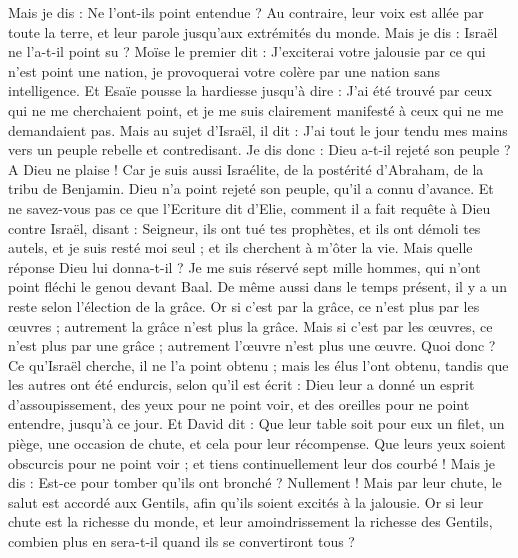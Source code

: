 \begin{multicols}{2}
Mais je dis : Ne l'ont-ils point entendue ? Au contraire, leur voix est allée par toute la terre, et leur parole jusqu’aux extrémités du monde.
Mais je dis : Israël ne l'a-t-il point su ? Moïse le premier dit : J’exciterai votre jalousie par ce qui n'est point une nation, je provoquerai votre colère par une nation sans intelligence.
Et Esaïe pousse la hardiesse jusqu’à dire : J'ai été trouvé par ceux qui ne me cherchaient point, et je me suis clairement manifesté à ceux qui ne me demandaient pas.
Mais au sujet d’Israël, il dit : J'ai tout le jour tendu mes mains vers un peuple rebelle et contredisant.
\VerseOne{}Je dis donc : Dieu a-t-il rejeté son peuple ? A Dieu ne plaise ! Car je suis aussi Israélite, de la postérité d'Abraham, de la tribu de Benjamin.
Dieu n'a point rejeté son peuple, qu’il a connu d’avance. Et ne savez-vous pas ce que l'Ecriture dit d'Elie, comment il a fait requête à Dieu contre Israël, disant :
Seigneur, ils ont tué tes prophètes, et ils ont démoli tes autels, et je suis resté moi seul ; et ils cherchent à m'ôter la vie.
Mais quelle réponse Dieu lui donna-t-il ? Je me suis réservé sept mille hommes, qui n'ont point fléchi le genou devant Baal.
De même aussi dans le temps présent, il y a un reste selon l'élection de la grâce.
Or si c'est par la grâce, ce n'est plus par les œuvres ; autrement la grâce n'est plus la grâce. Mais si c'est par les œuvres, ce n'est plus par une grâce ; autrement l’œuvre n'est plus une œuvre.
Quoi donc ? Ce qu'Israël cherche, il ne l'a point obtenu ; mais les élus l’ont obtenu, tandis que les autres ont été endurcis,
selon qu'il est écrit : Dieu leur a donné un esprit d’assoupissement, des yeux pour ne point voir, et des oreilles pour ne point entendre, jusqu’à ce jour. Et David dit :
Que leur table soit pour eux un filet, un piège, une occasion de chute, et cela pour leur récompense.
Que leurs yeux soient obscurcis pour ne point voir ; et tiens continuellement leur dos courbé !
Mais je dis : Est-ce pour tomber qu’ils ont bronché ? Nullement ! Mais par leur chute, le salut est accordé aux Gentils, afin qu’ils soient excités à la jalousie.
Or si leur chute est la richesse du monde, et leur amoindrissement la richesse des Gentils, combien plus en sera-t-il quand ils se convertiront tous ?

\end{multicols}
